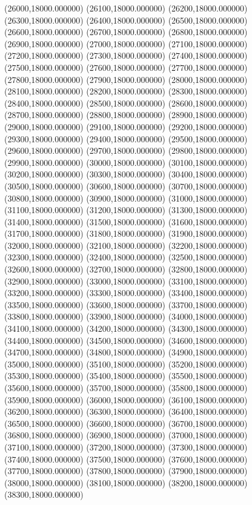 (26000,18000.000000)
(26100,18000.000000)
(26200,18000.000000)
(26300,18000.000000)
(26400,18000.000000)
(26500,18000.000000)
(26600,18000.000000)
(26700,18000.000000)
(26800,18000.000000)
(26900,18000.000000)
(27000,18000.000000)
(27100,18000.000000)
(27200,18000.000000)
(27300,18000.000000)
(27400,18000.000000)
(27500,18000.000000)
(27600,18000.000000)
(27700,18000.000000)
(27800,18000.000000)
(27900,18000.000000)
(28000,18000.000000)
(28100,18000.000000)
(28200,18000.000000)
(28300,18000.000000)
(28400,18000.000000)
(28500,18000.000000)
(28600,18000.000000)
(28700,18000.000000)
(28800,18000.000000)
(28900,18000.000000)
(29000,18000.000000)
(29100,18000.000000)
(29200,18000.000000)
(29300,18000.000000)
(29400,18000.000000)
(29500,18000.000000)
(29600,18000.000000)
(29700,18000.000000)
(29800,18000.000000)
(29900,18000.000000)
(30000,18000.000000)
(30100,18000.000000)
(30200,18000.000000)
(30300,18000.000000)
(30400,18000.000000)
(30500,18000.000000)
(30600,18000.000000)
(30700,18000.000000)
(30800,18000.000000)
(30900,18000.000000)
(31000,18000.000000)
(31100,18000.000000)
(31200,18000.000000)
(31300,18000.000000)
(31400,18000.000000)
(31500,18000.000000)
(31600,18000.000000)
(31700,18000.000000)
(31800,18000.000000)
(31900,18000.000000)
(32000,18000.000000)
(32100,18000.000000)
(32200,18000.000000)
(32300,18000.000000)
(32400,18000.000000)
(32500,18000.000000)
(32600,18000.000000)
(32700,18000.000000)
(32800,18000.000000)
(32900,18000.000000)
(33000,18000.000000)
(33100,18000.000000)
(33200,18000.000000)
(33300,18000.000000)
(33400,18000.000000)
(33500,18000.000000)
(33600,18000.000000)
(33700,18000.000000)
(33800,18000.000000)
(33900,18000.000000)
(34000,18000.000000)
(34100,18000.000000)
(34200,18000.000000)
(34300,18000.000000)
(34400,18000.000000)
(34500,18000.000000)
(34600,18000.000000)
(34700,18000.000000)
(34800,18000.000000)
(34900,18000.000000)
(35000,18000.000000)
(35100,18000.000000)
(35200,18000.000000)
(35300,18000.000000)
(35400,18000.000000)
(35500,18000.000000)
(35600,18000.000000)
(35700,18000.000000)
(35800,18000.000000)
(35900,18000.000000)
(36000,18000.000000)
(36100,18000.000000)
(36200,18000.000000)
(36300,18000.000000)
(36400,18000.000000)
(36500,18000.000000)
(36600,18000.000000)
(36700,18000.000000)
(36800,18000.000000)
(36900,18000.000000)
(37000,18000.000000)
(37100,18000.000000)
(37200,18000.000000)
(37300,18000.000000)
(37400,18000.000000)
(37500,18000.000000)
(37600,18000.000000)
(37700,18000.000000)
(37800,18000.000000)
(37900,18000.000000)
(38000,18000.000000)
(38100,18000.000000)
(38200,18000.000000)
(38300,18000.000000)
